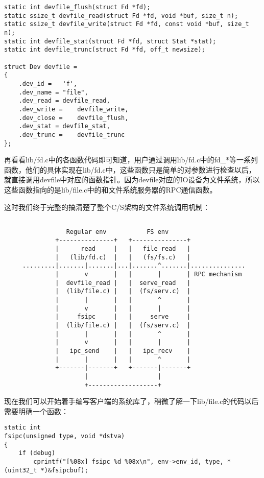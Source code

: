 \documentclass{article}
\begin{document}
\begin{CJK*}{UTF8}{gkai}
\begin{lstlisting}[style=ccode, title={\scriptsize \ttfamily \bfseries lib/file.c}]
static int devfile_flush(struct Fd *fd);
static ssize_t devfile_read(struct Fd *fd, void *buf, size_t n);
static ssize_t devfile_write(struct Fd *fd, const void *buf, size_t n);
static int devfile_stat(struct Fd *fd, struct Stat *stat);
static int devfile_trunc(struct Fd *fd, off_t newsize);

struct Dev devfile =
{
	.dev_id =	'f',
	.dev_name =	"file",
	.dev_read =	devfile_read,
	.dev_write =	devfile_write,
	.dev_close =	devfile_flush,
	.dev_stat =	devfile_stat,
	.dev_trunc =	devfile_trunc
};
\end{lstlisting}


再看看lib/fd.c中的各函数代码即可知道，用户通过调用lib/fd.c中的fd\_*等一系列函数，他们的具体实现在lib/fd.c中，这些函数只是简单的对参数进行检查以后，就直接调用devfile中对应的函数指针。因为devfile对应的IO设备为文件系统，所以这些函数指向的是lib/file.c中的和文件系统服务器的RPC通信函数。


这时我们终于完整的搞清楚了整个C/S架构的文件系统调用机制：

{ \footnotesize
\begin{verbatim}

                 Regular env           FS env
              +---------------+   +---------------+
              |      read     |   |   file_read   |
              |   (lib/fd.c)  |   |   (fs/fs.c)   |
     .........|.......|.......|...|.......^.......|...............
              |       v       |   |       |       | RPC mechanism
              |  devfile_read |   |  serve_read   |
              |  (lib/file.c) |   |  (fs/serv.c)  |
              |       |       |   |       ^       |
              |       v       |   |       |       |
              |     fsipc     |   |     serve     |
              |  (lib/file.c) |   |  (fs/serv.c)  |
              |       |       |   |       ^       |
              |       v       |   |       |       |
              |   ipc_send    |   |   ipc_recv    |
              |       |       |   |       ^       |
              +-------|-------+   +-------|-------+
                      |                   |
                      +-------------------+
\end{verbatim}
}

现在我们可以开始着手编写客户端的系统库了，稍微了解一下lib/file.c的代码以后需要明确一个函数：

\begin{lstlisting}[style=ccode, title={\scriptsize \ttfamily \bfseries lib/file.c: fsipc()}]
static int
fsipc(unsigned type, void *dstva)
{
	if (debug)
		cprintf("[%08x] fsipc %d %08x\n", env->env_id, type, *(uint32_t *)&fsipcbuf);


\end{lstlisting}
\end{CJK*}
\end{document}
